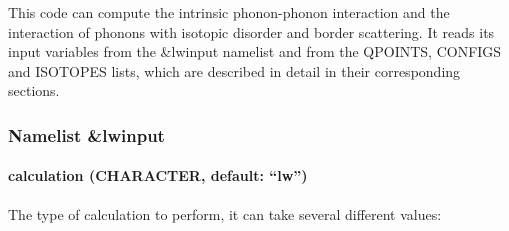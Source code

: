 \documentclass[
]{article}
\begin{document}
This code can compute the intrinsic phonon-phonon interaction and the
interaction of phonons with isotopic disorder and border scattering. It
reads its input variables from the \&lwinput namelist and from the
QPOINTS, CONFIGS and ISOTOPES lists, which are described in detail in
their corresponding sections.

\hypertarget{namelist-lwinput}{%
\subsubsection{Namelist \&lwinput}\label{namelist-lwinput}}

\hypertarget{calculation-character-default-lw}{%
\paragraph{\texorpdfstring{calculation (CHARACTER, default:
\enquote{lw})}{calculation (CHARACTER, default: ``lw'')}}\label{calculation-character-default-lw}}

The type of calculation to perform, it can take several different
values:
\end{document}
